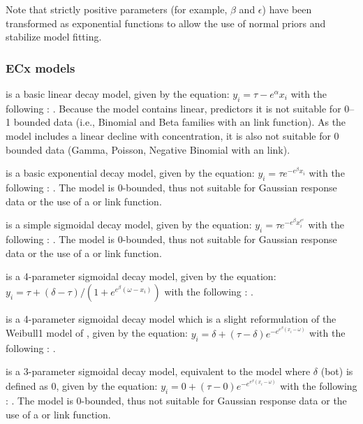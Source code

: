 \documentclass[
  shortnames]{jss}
\begin{document}
Note that strictly positive parameters (for example, \(\beta\) and \(\epsilon\)) have been transformed as exponential functions to allow the use of normal priors and stabilize model fitting.

\subsubsection[ECx models]{ECx models}\label{ecx-models}

 is a basic linear decay model, given by the equation:
\(y_i = \tau - e^{\alpha} x_i\)
with the following : . Because the model contains linear, predictors it is not suitable for 0--1 bounded data (i.e., Binomial and Beta families with an  link function). As the model includes a linear decline with concentration, it is also not suitable for 0 bounded data (Gamma, Poisson, Negative Binomial with an  link).

 is a basic exponential decay model, given by the equation: \(y_i = \tau e^{-e^{\beta} x_i}\)
with the following : . The model is 0-bounded, thus not suitable for Gaussian response data or the use of a  or  link function.

 is a simple sigmoidal decay model, given by the equation:
\(y_i = \tau e^{-e^{\beta} x_i^{e^\epsilon}}\)
with the following : . The model is 0-bounded, thus not suitable for Gaussian response data or the use of a  or  link function.

 is a 4-parameter sigmoidal decay model, given by the equation:
\(y_i = \tau + (\delta - \tau)/(1 + e^{e^{\beta} (\omega - x_i)})\)
with the following : .

 is a 4-parameter sigmoidal decay model which is a slight reformulation of the Weibull1 model of \citet{Ritz2016}, given by the equation:
\(y_i = \delta + (\tau - \delta) e^{-e^{e^{\beta} (x_i - \omega)}}\)
with the following : .

 is a 3-parameter sigmoidal decay model, equivalent to the  model where \(\delta\) (bot) is defined as 0, given by the equation:
\(y_i = {0} + (\tau - {0}) e^{-e^{e^{\beta} (x_i - \omega)}}\)
with the following : . The model is 0-bounded, thus not suitable for Gaussian response data or the use of a  or  link function.
\end{document}
